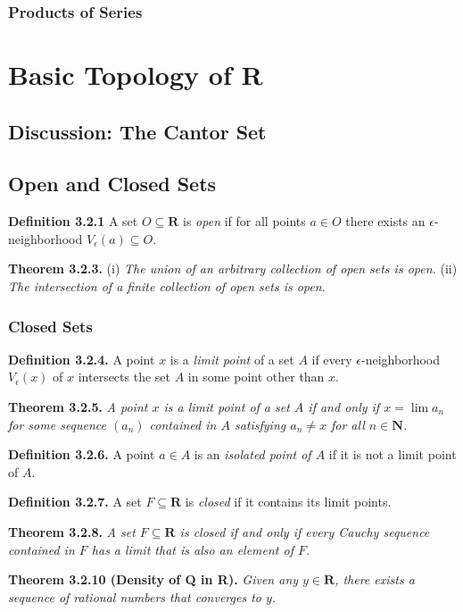 \documentclass[12pt]{report}
\newcommand{\R}{\textbf{R}}
\newcommand{\N}{\textbf{N}}
\begin{document}
\subsection*{Products of Series}

\chapter{Basic Topology of R}
\section{Discussion: The Cantor Set}
\section{Open and Closed Sets}

\noindent \textbf{Definition 3.2.1} A set $O\subseteq\R$ is \textit{open} if for all points $a\in O$ there exists an $\epsilon$-neighborhood $V_\epsilon(a)\subseteq O$.
\bigskip

\noindent \textbf{Theorem 3.2.3.} (i) \textit{The union of an arbitrary collection of open sets is open.} (ii) \textit{The intersection of a finite collection of open sets is open.}
\bigskip

\subsection*{Closed Sets}

\noindent \textbf{Definition 3.2.4.} A point $x$ is a \textit{limit point} of a set $A$ if every $\epsilon$-neighborhood $V_\epsilon(x)$ of $x$ intersects the set $A$ in some point other than $x$.
\bigskip

\noindent \textbf{Theorem 3.2.5.} \textit{A point $x$ is a limit point of a set $A$ if and only if $x=\lim a_n$ for some sequence $(a_n)$ contained in $A$ satisfying $a_n\neq x$ for all $n\in\N$.}
\bigskip

\noindent \textbf{Definition 3.2.6.} A point $a\in A$ is an \textit{isolated point of $A$} if it is not a limit point of $A$.
\bigskip

\noindent \textbf{Definition 3.2.7.} A set $F\subseteq\R$ is \textit{closed} if it contains its limit points.
\bigskip

\noindent \textbf{Theorem 3.2.8.} \textit{A set $F\subseteq\R$ is closed if and only if every Cauchy sequence contained in $F$ has a limit that is also an element of $F$.}
\bigskip

\noindent \textbf{Theorem 3.2.10 (Density of Q in R).} \textit{Given any $y\in\R$, there exists a sequence of rational numbers that converges to $y$.}
\end{document}
